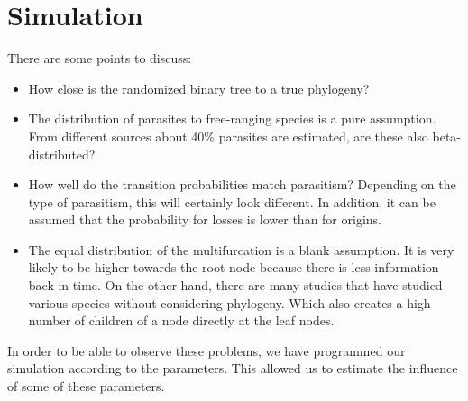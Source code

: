   \section{Simulation}


    There are some points to discuss:
    \begin{itemize}
      \item How close is the randomized binary tree to a true phylogeny?
      \item The distribution of parasites to free-ranging species is a pure assumption. From different 
        sources about 40\% parasites are estimated, are these also beta-distributed?
      \item How well do the transition probabilities match parasitism? Depending on the type of 
        parasitism, this will certainly look different. In addition, it can be assumed that the 
        probability for losses is lower than for origins.
      \item The equal distribution of the multifurcation is a blank assumption. It is very likely to 
        be higher towards the root node because there is less information back in time. On the other 
        hand, there are many studies that have studied various species without considering phylogeny. 
        Which also creates a high number of children of a node directly at the leaf nodes.
    \end{itemize}
    In order to be able to observe these problems, we have programmed our simulation according to the 
      parameters. This allowed us to estimate the influence of some of these parameters.



